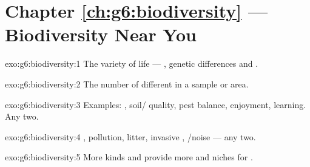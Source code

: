 \section*{Chapter \ref{ch:g6:biodiversity} --- Biodiversity Near You}

\begin{solution}{exo:g6:biodiversity:1}
The variety of life --- , genetic differences and .
\end{solution}

\begin{solution}{exo:g6:biodiversity:2}
The number of different  in a sample or area.
\end{solution}

\begin{solution}{exo:g6:biodiversity:3}
Examples: , soil/ quality, pest balance, enjoyment,
learning. Any two.
\end{solution}

\begin{solution}{exo:g6:biodiversity:4}
, pollution, litter, invasive , /noise --- any
two.
\end{solution}

\begin{solution}{exo:g6:biodiversity:5}
More  kinds and  provide more  and  niches for
.
\end{solution}

